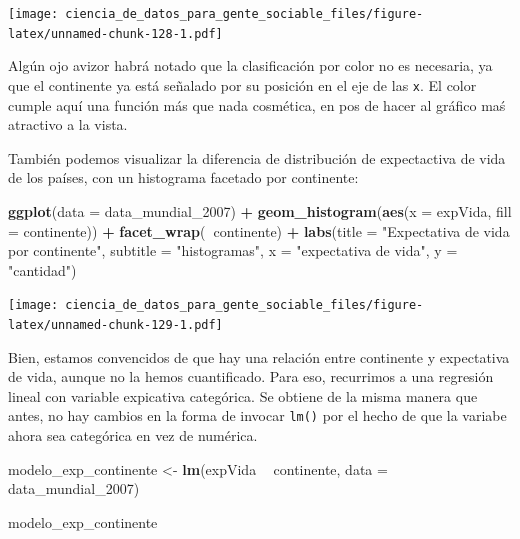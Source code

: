 \documentclass[]{book}
\newenvironment{Shaded}{\begin{snugshade}}{\end{snugshade}}
\newcommand{\KeywordTok}[1]{\textcolor[rgb]{0.13,0.29,0.53}{\textbf{#1}}}
\newcommand{\DataTypeTok}[1]{\textcolor[rgb]{0.13,0.29,0.53}{#1}}
\newcommand{\DecValTok}[1]{\textcolor[rgb]{0.00,0.00,0.81}{#1}}
\newcommand{\StringTok}[1]{\textcolor[rgb]{0.31,0.60,0.02}{#1}}
\newcommand{\OperatorTok}[1]{\textcolor[rgb]{0.81,0.36,0.00}{\textbf{#1}}}
\newcommand{\NormalTok}[1]{#1}
\begin{document}
\texttt{[image: ciencia\_de\_datos\_para\_gente\_sociable\_files/figure-latex/unnamed-chunk-128-1.pdf]}

Algún ojo avizor habrá notado que la clasificación por color no es
necesaria, ya que el continente ya está señalado por su posición en el
eje de las \texttt{x}. El color cumple aquí una función más que nada
cosmética, en pos de hacer al gráfico maś atractivo a la vista.

También podemos visualizar la diferencia de distribución de expectactiva
de vida de los países, con un histograma facetado por continente:

\begin{Shaded}
\begin{Highlighting}[]
\KeywordTok{ggplot}\NormalTok{(}\DataTypeTok{data =}\NormalTok{ data_mundial_}\DecValTok{2007}\NormalTok{) }\OperatorTok{+}
\StringTok{    }\KeywordTok{geom_histogram}\NormalTok{(}\KeywordTok{aes}\NormalTok{(}\DataTypeTok{x =}\NormalTok{ expVida, }\DataTypeTok{fill =}\NormalTok{ continente)) }\OperatorTok{+}
\StringTok{    }\KeywordTok{facet_wrap}\NormalTok{(}\OperatorTok{~}\NormalTok{continente) }\OperatorTok{+}
\StringTok{    }\KeywordTok{labs}\NormalTok{(}\DataTypeTok{title =} \StringTok{"Expectativa de vida por continente"}\NormalTok{,}
         \DataTypeTok{subtitle =} \StringTok{"histogramas"}\NormalTok{,}
        \DataTypeTok{x =} \StringTok{"expectativa de vida"}\NormalTok{,}
        \DataTypeTok{y =} \StringTok{"cantidad"}\NormalTok{)}
\end{Highlighting}
\end{Shaded}

\texttt{[image: ciencia\_de\_datos\_para\_gente\_sociable\_files/figure-latex/unnamed-chunk-129-1.pdf]}

Bien, estamos convencidos de que hay una relación entre continente y
expectativa de vida, aunque no la hemos cuantificado. Para eso,
recurrimos a una regresión lineal con variable expicativa categórica. Se
obtiene de la misma manera que antes, no hay cambios en la forma de
invocar \texttt{lm()} por el hecho de que la variabe ahora sea
categórica en vez de numérica.

\begin{Shaded}
\begin{Highlighting}[]
\NormalTok{modelo_exp_continente <-}\StringTok{ }\KeywordTok{lm}\NormalTok{(expVida }\OperatorTok{~}\StringTok{ }\NormalTok{continente, }\DataTypeTok{data =}\NormalTok{ data_mundial_}\DecValTok{2007}\NormalTok{)}


\NormalTok{modelo_exp_continente}
\end{Highlighting}
\end{Shaded}
\end{document}
